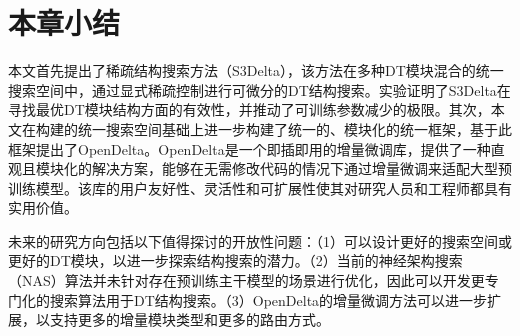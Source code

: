 \section{本章小结}
本文首先提出了稀疏结构搜索方法（S3Delta），该方法在多种DT模块混合的统一搜索空间中，通过显式稀疏控制进行可微分的DT结构搜索。实验证明了S3Delta在寻找最优DT模块结构方面的有效性，并推动了可训练参数减少的极限。其次，本文在构建的统一搜索空间基础上进一步构建了统一的、模块化的统一框架，基于此框架提出了OpenDelta。OpenDelta是一个即插即用的增量微调库，提供了一种直观且模块化的解决方案，能够在无需修改代码的情况下通过增量微调来适配大型预训练模型。该库的用户友好性、灵活性和可扩展性使其对研究人员和工程师都具有实用价值。

未来的研究方向包括以下值得探讨的开放性问题：（1）可以设计更好的搜索空间或更好的DT模块，以进一步探索结构搜索的潜力。（2）当前的神经架构搜索（NAS）算法并未针对存在预训练主干模型的场景进行优化，因此可以开发更专门化的搜索算法用于DT结构搜索。（3）OpenDelta的增量微调方法可以进一步扩展，以支持更多的增量模块类型和更多的路由方式。